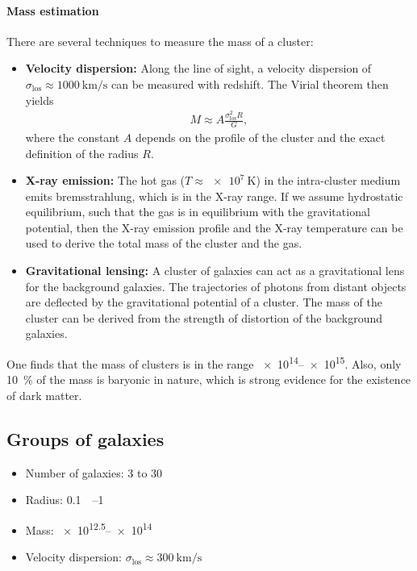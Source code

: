 \paragraph*{Mass estimation}
There are several techniques to measure the mass of a cluster:
\begin{itemize}
	\item \textbf{Velocity dispersion:}
	Along the line of sight, a velocity dispersion of $\sigma_\text{los} \approx \SI{1000}{\kilo\metre\per\second}$ can be measured with redshift.
	The Virial theorem then yields
	\begin{align*}
		M \approx A \frac{\sigma_\text{los}^2 R}{G},
	\end{align*}
	where the constant $A$ depends on the profile of the cluster and the exact definition of the radius $R$.
	\item \textbf{X-ray emission:}
	The hot gas ($T \approx \SI{e7}{\kelvin}$) in the intra-cluster medium emits bremsstrahlung, which is in the X-ray range.
	If we assume hydrostatic equilibrium, such that the gas is in equilibrium with the gravitational potential, then the X-ray emission profile and the X-ray temperature can be used to derive the total mass of the cluster and the gas.
	\item \textbf{Gravitational lensing:}
	A cluster of galaxies can act as a gravitational lens for the background galaxies.
	The trajectories of photons from distant objects are deflected by the gravitational potential of a cluster.
	The mass of the cluster can be derived from the strength of distortion of the background galaxies.
\end{itemize}

One finds that the mass of clusters is in the range \SIrange{e14}{e15}{\solarmass}.
Also, only \SI{10}{\percent} of the mass is baryonic in nature, which is strong evidence for the existence of dark matter.





\subsection{Groups of galaxies}
\begin{itemize}
	\item Number of galaxies: 3 to 30
	\item Radius: \SIrange{0.1}{1}{\mega\parsec}
	\item Mass: \SIrange{e12.5}{e14}{\solarmass}
	\item Velocity dispersion: $\sigma_\text{los} \approx \SI{300}{\kilo\metre\per\second}$
\end{itemize}

